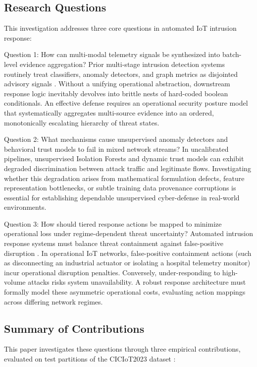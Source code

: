 \documentclass[journal,10pt,onecolumn]{IEEEtran}
\begin{document}
\subsection{Research Questions}
This investigation addresses three core questions in automated IoT intrusion response:

Question 1: How can multi-modal telemetry signals be synthesized into batch-level evidence aggregation?
Prior multi-stage intrusion detection systems routinely treat classifiers, anomaly detectors, and graph metrics as disjointed advisory signals \cite{3, 17}. Without a unifying operational abstraction, downstream response logic inevitably devolves into brittle nests of hard-coded boolean conditionals. An effective defense requires an operational security posture model that systematically aggregates multi-source evidence into an ordered, monotonically escalating hierarchy of threat states.

Question 2: What mechanisms cause unsupervised anomaly detectors and behavioral trust models to fail in mixed network streams?
In uncalibrated pipelines, unsupervised Isolation Forests and dynamic trust models can exhibit degraded discrimination between attack traffic and legitimate flows. Investigating whether this degradation arises from mathematical formulation defects, feature representation bottlenecks, or subtle training data provenance corruptions is essential for establishing dependable unsupervised cyber-defense in real-world environments.

Question 3: How should tiered response actions be mapped to minimize operational loss under regime-dependent threat uncertainty?
Automated intrusion response systems must balance threat containment against false-positive disruption \cite{27}. In operational IoT networks, false-positive containment actions (such as disconnecting an industrial actuator or isolating a hospital telemetry monitor) incur operational disruption penalties. Conversely, under-responding to high-volume attacks risks system unavailability. A robust response architecture must formally model these asymmetric operational costs, evaluating action mappings across differing network regimes.


\subsection{Summary of Contributions}
This paper investigates these questions through three empirical contributions, evaluated on test partitions of the CICIoT2023 dataset \cite{3}:
\end{document}
